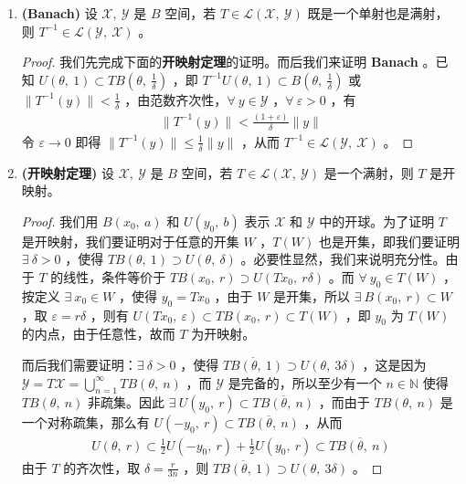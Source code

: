 \begin{enumerate}[leftmargin=2cm, label=\arabic*]
\begin{proof}
    $\forall\ f\in A_n$ ，$\forall\ \varepsilon > 0$ ，由 Weierstrass 逼近定理，存在多项式 $p$ ，使得 $\|f-p\| < \frac{\varepsilon}{2}$ ，$p$ 的导数在 $[0,\ 1]$ 上是有界的，因此根据中值定理，$\exists\ M>0$ ，使得对 $\forall\ s\in[0,\ 1]$ ，以及 $|h|<\frac{1}{n}$ ，使得 $|p(s+h) - p(s)| \leqslant M|h|$ 。设 $g(s)\in C[0,\ 1]$ 是一个分段线性函数，满足 $\|g\|<\frac{\varepsilon}{2}$ ，并且各条线段的线段斜率的绝对值都大于 $M+n$ ，那么 $p+g\in B(f,\ \varepsilon)$ ，而 $p+g\notin A_n$ ，故而每个 $A_n$ 都是疏集，则 $\mathscr{X}$ 是第二纲集。
\end{proof}
    \item \textbf{(Banach)} 设 $\mathscr{X},\ \mathscr{Y}$ 是 $B$ 空间，若 $T\in\mathscr{L}(\mathscr{X},\ \mathscr{Y})$ 既是一个单射也是满射，则 $T^{-1}\in\mathscr{L}(\mathscr{Y},\ \mathscr{X})$ 。
\begin{proof}
    我们先完成下面的\textbf{开映射定理}的证明。而后我们来证明 \textbf{Banach} 。已知 $U(\theta,\ 1)\subset TB(\theta,\ \frac{1}{\delta})$ ，即 $T^{-1} U(\theta,\ 1)\subset B(\theta,\ \frac{1}{\delta})$ 或 $\|T^{-1}(y)\| < \frac{1}{\delta}$ ，由范数齐次性，$\forall\ y\in\mathscr{Y}$ ，$\forall\ \varepsilon > 0$ ，有
\begin{align*}
    \|T^{-1}(y)\| < \frac{(1+\varepsilon)}{\delta} \|y\|
\end{align*}
令 $\varepsilon\to 0$ 即得 $\|T^{-1}(y)\| \leqslant \frac{1}{\delta} \|y\|$ ，从而 $T^{-1}\in\mathscr{L}(\mathscr{Y},\ \mathscr{X})$ 。
\end{proof}
    \item \textbf{(开映射定理)} 设 $\mathscr{X},\ \mathscr{Y}$ 是 $B$ 空间，若 $T\in\mathscr{L}(\mathscr{X},\ \mathscr{Y})$ 是一个满射，则 $T$ 是开映射。
\begin{proof}
    我们用 $B(x_0,\ a)$ 和 $U(y_0,\ b)$ 表示 $\mathscr{X}$ 和 $\mathscr{Y}$ 中的开球。为了证明 $T$ 是开映射，我们要证明对于任意的开集 $W$ ，$T(W)$ 也是开集，即我们要证明 $\exists\ \delta>0$ ，使得 $TB(\theta,\ 1)\supset U(\theta,\ \delta)$ 。必要性显然，我们来说明充分性。由于 $T$ 的线性，条件等价于 $TB(x_0,\ r)\supset U(Tx_0,\ r\delta)$ 。而 $\forall\ y_0\in T(W)$ ，按定义 $\exists\ x_0\in W$ ，使得 $y_0 = Tx_0$ ，由于 $W$ 是开集，所以 $\exists\ B(x_0,\ r)\subset W$ ，取 $\varepsilon = r\delta$ ，则有 $U(Tx_0,\ \varepsilon)\subset TB(x_0,\ r)\subset T(W)$ ，即 $y_0$ 为 $T(W)$ 的内点，由于任意性，故而 $T$ 为开映射。
    
    而后我们需要证明：$\exists\ \delta>0$ ，使得 $\overline{TB(\theta,\ 1)} \supset U(\theta,\ 3\delta)$ ，这是因为 $\mathscr{Y} = T\mathscr{X} = \bigcup\limits_{n=1}^{\infty} TB(\theta,\ n)$ ，而 $\mathscr{Y}$ 是完备的，所以至少有一个 $n\in\mathbb{N}$ 使得 $TB(\theta,\ n)$ 非疏集。因此 $\exists\ U(y_0,\ r)\subset \overline{TB(\theta,\ n)}$ ，而由于 $TB(\theta,\ n)$ 是一个对称疏集，那么有 $U(-y_0,\ r)\subset \overline{TB(\theta,\ n)}$ ，从而 
\begin{align*}
    U(\theta,\ r)\subset \frac{1}{2}U(-y_0,\ r) + \frac{1}{2}U(y_0,\ r)\subset \overline{TB(\theta,\ n)}
\end{align*}
由于 $T$ 的齐次性，取 $\delta = \frac{r}{3n}$ ，则 $\overline{TB(\theta,\ 1)}\supset U(\theta,\ 3\delta)$ 。


\end{proof}
\end{enumerate}

